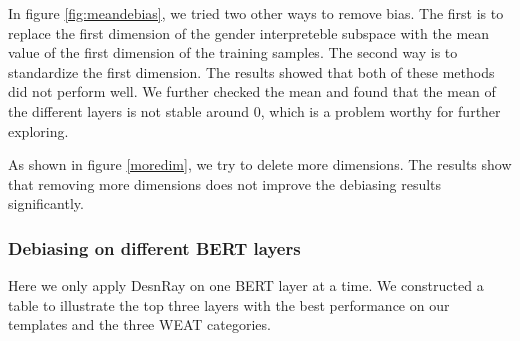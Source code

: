 In figure \ref{fig:meandebias}, we tried two other ways to remove bias. The first is to replace the first dimension of the gender interpreteble subspace with the mean value of the first dimension of the training samples. The second way is to standardize the first dimension. The results showed that both of these methods did not perform well. We further checked the mean and found that the mean of the different layers is not stable around 0, which is a problem worthy for further exploring.
\begin{figure*}
    \centering
    \caption{Here should be a graph.}
    \label{fig:meandebias}
\end{figure*}

As shown in figure \ref{moredim}, we try to delete more dimensions. The results show that removing more dimensions does not improve the debiasing results significantly. 
\begin{figure*}
    \centering
    \caption{Here should be a graph.}
    \label{fig:moredim}
\end{figure*}

\subsubsection{Debiasing on different BERT layers}
Here we only apply DesnRay on one BERT layer at a time. We constructed a table to illustrate the top three layers with the best performance on our templates and the three WEAT categories.
\begin{table*}[ht]
\centering
\begin{tabular}{llllllllll}
\hline
\end{tabular}
\caption{\label{t:bestlayers}
Here needs a table.}
\end{table*}

